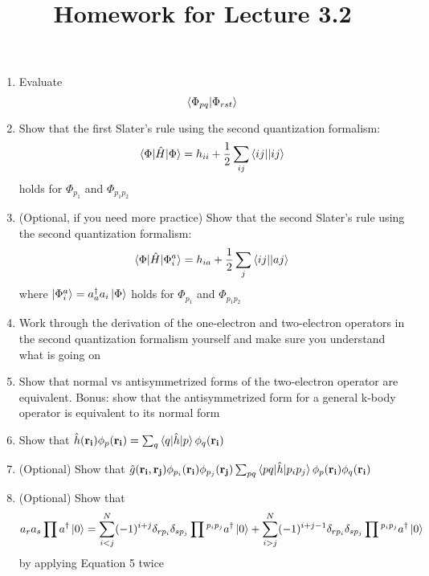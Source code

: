 \documentclass{article}
\title{Homework for Lecture 3.2 }
\date{}
\newcommand{\dg}{\ensuremath{^\dagger} }
\def\*#1{\mathbf{#1}}
\begin{document}
\maketitle
\noindent
\begin{enumerate}
\item Evaluate \[\braket{\Phi_{pq} | \Phi_{rst}} \]
\item Show that the first Slater's rule using the second quantization formalism: 
\[\braket{\Phi | \hat{H} | \Phi} = h_{ii} + \frac{1}{2} \sum_{ij} \braket{ij || ij} \]
holds for $\Phi_{p_1}$ and $\Phi_{p_1 p_2}$
\item (Optional, if you need more practice) Show that the second Slater's rule using the second quantization formalism: 
\[\braket{\Phi | \hat{H} | \Phi_i^a } = h_{ia} + \frac{1}{2} \sum_{j} \braket{ij || aj} \]
where $\ket{\Phi_i^a } = a_a\dg a_i \ket{\Phi}$ holds for $\Phi_{p_1}$ and $\Phi_{p_1 p_2}$
\item Work through the derivation of the one-electron and two-electron operators in the second quantization formalism yourself and make sure you understand what is going on 
\item Show that normal vs antisymmetrized forms of the two-electron operator are equivalent. Bonus: show that the antisymmetrized form for a general k-body operator is equivalent to its normal form 
\item Show that $\hat{h}(\*{r_i}) \phi_p (\*{r_i})  = \sum_q \braket{q | \hat{h} | p } \phi_q (\*{r_i}) $
\item (Optional) Show that $\hat{g}(\*{r_i}, \*{r_j}) \phi_{p_i} (\*{r_i}) \phi_{p_j} (\*{r_j})  \sum_{pq} \braket{pq | \hat{h} | p_i p_j  }  \phi_p (\*{r_i})  \phi_q (\*{r_i})$
\item (Optional) Show that 
\[a_r a_s \prod a\dg \ket{0} = \sum\limits_{i < j} ^N  (-1)^{i + j }   \delta_{rp_i} \delta_{sp_j}  \prod{}^{p_ip_j} a\dg \ket{0} + 
\sum\limits_{i > j} ^N  (-1)^{i + j -1} \delta_{rp_i} \delta_{sp_j} \prod{}^{p_ip_j}a\dg \ket{0} \]
by applying Equation 5 twice 
\end{enumerate}
\end{document}
